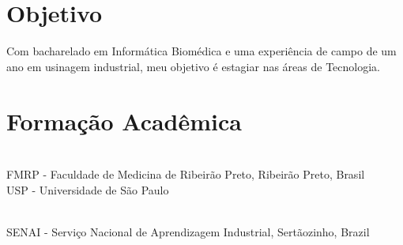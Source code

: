 \documentclass[mm]{simple_style}
\begin{document}
\begin{resume}

\section{Objetivo}
\vspace{-1ex}
Com bacharelado em Informática Biomédica e uma experiência de campo de um ano em usinagem industrial, meu objetivo é estagiar nas áreas de Tecnologia.
\\
\vspace{-4ex}

\sectionline



\section{Formação Acadêmica}
\vspace{-1ex}
 \\
FMRP - Faculdade de Medicina de Ribeirão Preto, Ribeirão Preto, Brasil
\\
USP - Universidade de São Paulo\par

 \\ 
SENAI - Serviço Nacional de Aprendizagem Industrial, Sertãozinho, Brazil  \par
\vspace{-1ex}
\sectionline




\end{resume}
\end{document}
